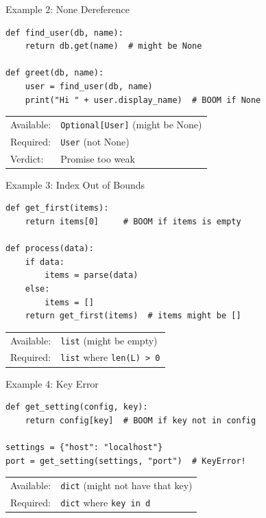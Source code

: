 \documentclass[aspectratio=169,10pt]{beamer}
\begin{document}
\begin{frame}[fragile]{Example 2: None Dereference}
\begin{lstlisting}
def find_user(db, name):
    return db.get(name)  # might be None

def greet(db, name):
    user = find_user(db, name)
    print("Hi " + user.display_name)  # BOOM if None
\end{lstlisting}
\vspace{0.3em}
\begin{tabular}{@{}ll@{}}
Available: & \texttt{Optional[User]} (might be None) \\
Required:  & \texttt{User} (not None) \\
Verdict:   & \textcolor{danger}{Promise too weak} \\
\end{tabular}
\end{frame}

\begin{frame}[fragile]{Example 3: Index Out of Bounds}
\begin{lstlisting}
def get_first(items):
    return items[0]     # BOOM if items is empty

def process(data):
    if data:
        items = parse(data)
    else:
        items = []
    return get_first(items)  # items might be []
\end{lstlisting}
\vspace{0.3em}
\begin{tabular}{@{}ll@{}}
Available: & \texttt{list} (might be empty) \\
Required:  & \texttt{list} where \texttt{len(L) > 0} \\
\end{tabular}
\end{frame}

\begin{frame}[fragile]{Example 4: Key Error}
\begin{lstlisting}
def get_setting(config, key):
    return config[key]  # BOOM if key not in config

settings = {"host": "localhost"}
port = get_setting(settings, "port")  # KeyError!
\end{lstlisting}
\vspace{0.3em}
\begin{tabular}{@{}ll@{}}
Available: & \texttt{dict} (might not have that key) \\
Required:  & \texttt{dict} where \texttt{key in d} \\
\end{tabular}
\end{frame}
\end{document}
